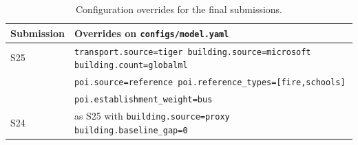 \documentclass[11pt]{article}
\begin{document}
\begin{table}[htbp]
\centering
\small
\caption{Configuration overrides for the final submissions.}
\label{tab:overrides}
\begin{tabular}{ll}
\toprule
Submission & Overrides on \texttt{configs/model.yaml} \\
\midrule
S25 & \texttt{transport.source=tiger building.source=microsoft building.count=globalml} \\
    & \texttt{poi.source=reference poi.reference\_types=[fire,schools]} \\
    & \texttt{poi.establishment\_weight=bus} \\
S24 & as S25 with \texttt{building.source=proxy building.baseline\_gap=0} \\
\bottomrule
\end{tabular}
\end{table}
\end{document}
